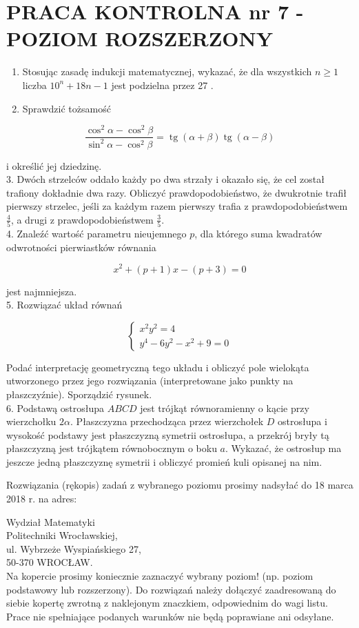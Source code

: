 \documentclass[10pt]{article}
\begin{document}
\section*{PRACA KONTROLNA nr 7 - POZIOM ROZSZERZONY}
\begin{enumerate}
  \item Stosując zasadę indukcji matematycznej, wykazać, że dla wszystkich $n \geq 1$ liczba $10^{n}+18 n-1$ jest podzielna przez 27 .
  \item Sprawdzić tożsamość
\end{enumerate}

$$
\frac{\cos ^{2} \alpha-\cos ^{2} \beta}{\sin ^{2} \alpha-\cos ^{2} \beta}=\operatorname{tg}(\alpha+\beta) \operatorname{tg}(\alpha-\beta)
$$

i określić jej dziedzinę.\\
3. Dwóch strzelców oddało każdy po dwa strzały i okazało się, że cel został trafiony dokładnie dwa razy. Obliczyć prawdopodobieństwo, że dwukrotnie trafił pierwszy strzelec, jeśli za każdym razem pierwszy trafia z prawdopodobieństwem $\frac{4}{5}$, a drugi z prawdopodobieństwem $\frac{3}{5}$.\\
4. Znaleźć wartość parametru nieujemnego $p$, dla którego suma kwadratów odwrotności pierwiastków równania

$$
x^{2}+(p+1) x-(p+3)=0
$$

jest najmniejsza.\\
5. Rozwiązać układ równań

$$
\left\{\begin{array}{l}
x^{2} y^{2}=4 \\
y^{4}-6 y^{2}-x^{2}+9=0
\end{array}\right.
$$

Podać interpretację geometryczną tego układu i obliczyć pole wielokąta utworzonego przez jego rozwiązania (interpretowane jako punkty na płaszczyźnie). Sporządzić rysunek.\\
6. Podstawą ostrosłupa $A B C D$ jest trójkąt równoramienny o kącie przy wierzchołku $2 \alpha$. Płaszczyzna przechodząca przez wierzchołek $D$ ostrosłupa i wysokość podstawy jest płaszczyzną symetrii ostrosłupa, a przekrój bryły tą płaszczyzną jest trójkątem równobocznym o boku $a$. Wykazać, że ostrosłup ma jeszcze jedną płaszczyznę symetrii i obliczyć promień kuli opisanej na nim.

Rozwiązania (rękopis) zadań z wybranego poziomu prosimy nadsyłać do 18 marca 2018 r. na adres:

Wydział Matematyki\\
Politechniki Wrocławskiej,\\
ul. Wybrzeże Wyspiańskiego 27,\\
50-370 WROCŁAW.\\
Na kopercie prosimy koniecznie zaznaczyć wybrany poziom! (np. poziom podstawowy lub rozszerzony). Do rozwiązań należy dołączyć zaadresowaną do siebie kopertę zwrotną z naklejonym znaczkiem, odpowiednim do wagi listu. Prace nie spełniające podanych warunków nie będą poprawiane ani odsyłane.
\end{document}
